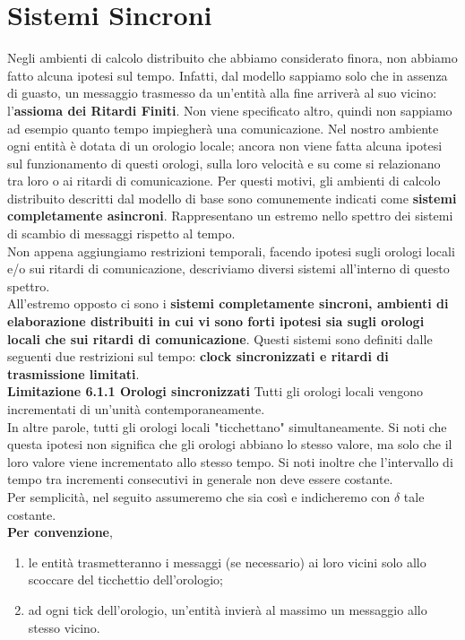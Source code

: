 \chapter{Sistemi Sincroni}
Negli ambienti di calcolo distribuito che abbiamo considerato finora, non
abbiamo fatto alcuna ipotesi sul tempo. Infatti, dal modello sappiamo solo che
in assenza di guasto, un messaggio trasmesso da un'entità alla fine arriverà al
suo vicino: l'\textbf{assioma dei Ritardi Finiti}. Non viene specificato altro,
quindi non sappiamo ad esempio quanto tempo impiegherà una comunicazione. Nel
nostro ambiente ogni entità è dotata di un orologio locale; ancora non viene
fatta alcuna ipotesi sul funzionamento di questi orologi, sulla loro velocità e
su come si relazionano tra loro o ai ritardi di comunicazione. Per questi
motivi, gli ambienti di calcolo distribuito descritti dal modello di base sono
comunemente indicati come \textbf{sistemi completamente asincroni}.
Rappresentano un estremo nello spettro dei sistemi di scambio di messaggi
rispetto al tempo.\\
Non appena aggiungiamo restrizioni temporali, facendo ipotesi sugli orologi
locali e/o sui ritardi di comunicazione, descriviamo diversi sistemi all'interno
di questo spettro.\\
All'estremo opposto ci sono i \textbf{sistemi completamente sincroni, ambienti
    di elaborazione distribuiti in cui vi sono forti ipotesi sia sugli orologi
    locali che sui ritardi di comunicazione}. Questi sistemi sono definiti dalle
seguenti due restrizioni sul tempo: \textbf{clock sincronizzati e ritardi di
    trasmissione limitati}.\\

\textbf{Limitazione 6.1.1 Orologi sincronizzati} Tutti gli orologi locali
vengono incrementati di un'unità contemporaneamente.\\
In altre parole, tutti gli orologi locali "ticchettano" simultaneamente. Si noti
che questa ipotesi non significa che gli orologi abbiano lo stesso valore, ma
solo che il loro valore viene incrementato allo stesso tempo. Si noti inoltre
che l'intervallo di tempo tra incrementi consecutivi in generale non deve essere
costante.\\
Per semplicità, nel seguito assumeremo che sia così e indicheremo con $\delta$
tale costante.\\

\textbf{Per convenzione},
\begin{enumerate}
    \item le entità trasmetteranno i messaggi (se necessario) ai loro vicini solo
          allo scoccare del ticchettio dell'orologio;
    \item ad ogni tick dell'orologio, un'entità invierà al massimo un messaggio
          allo stesso vicino.
\end{enumerate}

